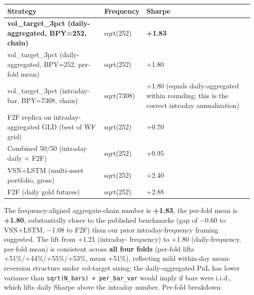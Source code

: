 \documentclass[
]{article}
\newcounter{none} %
\begin{document}
{\def\LTcaptype{none} %
\begin{longtable}[]{@{}
  >{\raggedright\arraybackslash}p{}
  >{\raggedright\arraybackslash}p{}
  >{\raggedleft\arraybackslash}p{}@{}}
\toprule\noalign{}
\begin{minipage}[b]{\linewidth}\raggedright
Strategy
\end{minipage} & \begin{minipage}[b]{\linewidth}\raggedright
Frequency
\end{minipage} & \begin{minipage}[b]{\linewidth}\raggedleft
Sharpe
\end{minipage} \\
\midrule\noalign{}
\endhead
\bottomrule\noalign{}
\endlastfoot
\textbf{vol\_target\_3pct (daily-aggregated, BPY=252, chain)} &
sqrt(252) & \textbf{+1.83} \\
vol\_target\_3pct (daily-aggregated, BPY=252, per-fold mean) & sqrt(252)
& +1.80 \\
vol\_target\_3pct (intraday-bar, BPY=7308, chain) & sqrt(7308) & +1.80
(equals daily-aggregated within rounding; this is the correct intraday
annualization) \\
F2F replica on intraday-aggregated GLD (best of WF grid) & sqrt(252) &
+0.70 \\
Combined 50/50 (intraday daily + F2F) & sqrt(252) & +0.95 \\
VSN+LSTM (multi-asset portfolio, gross) & sqrt(252) & +2.40 \\
F2F (daily gold futures) & sqrt(252) & +2.88 \\
\end{longtable}
}

The frequency-aligned aggregate-chain number is \textbf{+1.83}, the
per-fold mean is \textbf{+1.80}, substantially closer to the published
benchmarks (gap of −0.60 to VSN+LSTM, −1.08 to F2F) than our prior
intraday-frequency framing suggested. The lift from +1.21 (intraday-
frequency) to +1.80 (daily-frequency, per-fold mean) is consistent
across \textbf{all four folds} (per-fold lifts +51\%/+44\%/+55\%/+53\%,
mean +51\%), reflecting mild within-day mean-reversion structure under
vol-target sizing: the daily-aggregated PnL has lower variance than
\texttt{sqrt(N\_bars)\ ×\ per\_bar\_var} would imply if bars were
i.i.d., which lifts daily Sharpe above the intraday number. Per-fold
breakdown:
\end{document}
